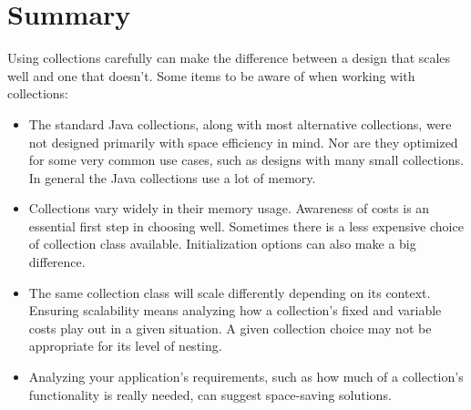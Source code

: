 \section{Summary}
Using collections carefully can
make the difference between a design that scales well and one that
doesn't. Some items to be aware of when working with collections:
\begin{itemize}
  \item The standard Java collections, along with most alternative
  collections, were not designed primarily with space efficiency in mind. Nor
  are they optimized for some very common use cases, such as designs with many small collections.
  In general the Java collections use a lot of memory.
  \item Collections vary widely in their memory usage. Awareness of
  costs is an essential first step in choosing well. Sometimes there is a less
  expensive choice of collection class available. Initialization options
  can also make a big difference.
  \item The same collection class will scale differently depending on its
  context. Ensuring scalability means
  analyzing how a collection's fixed and variable costs
  play out in a given situation. A given collection choice may not be appropriate for its level of nesting.
  \item Analyzing your application's requirements, such as 
  how much of a collection's functionality is really needed, can suggest
  space-saving solutions.
\end{itemize}
